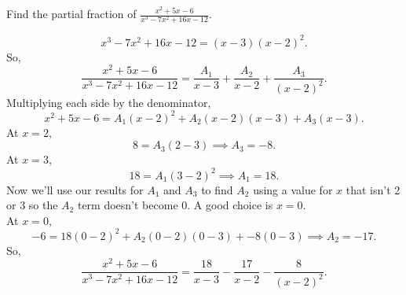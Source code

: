 \begin{example}
	Find the partial fraction of $\frac{x^2+5x-6}{x^3-7x^2+16x-12}$.
\end{example}
\begin{answer}
	\begin{equation*}
		x^3-7x^2+16x-12 = (x-3)(x-2)^2.
	\end{equation*}
	So,
	\begin{equation*}
		\frac{x^2+5x-6}{x^3-7x^2+16x-12} =  \frac{A_1}{x-3} + \frac{A_2}{x-2} + \frac{A_3}{(x-2)^2}.
	\end{equation*}
	Multiplying each side by the denominator,
	\begin{equation*}
		x^2+5x-6 = A_1(x-2)^2 + A_2(x-2)(x-3) + A_3(x-3).
	\end{equation*}
	At $x=2$,
	\begin{equation*}
		8 = A_3(2-3) \implies A_3 = -8.
	\end{equation*}
	At $x=3$,
	\begin{equation*}
		18 = A_1(3-2)^2 \implies A_1 = 18.
	\end{equation*}
	Now we'll use our results for $A_1$ and $A_3$ to find $A_2$ using a value for $x$ that isn't 2 or 3 so the $A_2$ term doesn't become 0. A good choice is $x=0$.\\
	At $x=0$,
	\begin{equation*}
		-6 = 18(0-2)^2 + A_2(0-2)(0-3) + -8(0-3) \implies A_2 = -17.
	\end{equation*}
	So,
	\begin{equation*}
		\frac{x^2+5x-6}{x^3-7x^2+16x-12} = \frac{18}{x-3} - \frac{17}{x-2} - \frac{8}{(x-2)^2}.
	\end{equation*}
\end{answer}